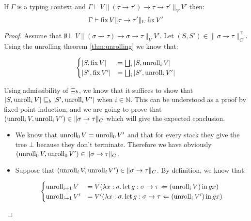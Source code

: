 \begin{alemma}
    If $\Gamma$ is a typing context and $\Gamma \vdash V \| (\tau \to \tau') \to
\tau \to \tau' \|_V V'$ then:
    \begin{equation*}
        \Gamma \vdash \Fix V \| \tau \to \tau' \|_C \Fix V'
    \end{equation*}
\end{alemma}
\begin{proof}
Assume that $\emptyset \vdash V \| (\sigma \to \tau) \to \sigma \to
\tau \|_V V'$. Let $(S,S') \in \| \sigma \to \tau\|_C^\top$.
Using the unrolling theorem \ref{thm:unrolling} we know that:

\begin{equation*}
    \begin{cases}
        |S, \Fix V| &= \bigsqcup_i | S, \Unroll_i V |     \\
        |S', \Fix V'| &= \bigsqcup_i | S', \Unroll_i V' |
    \end{cases}
\end{equation*}

Using admissibility of $\sqeq_b$, we know that it suffices 
to show that $|S, \Unroll_i V| \sqeq_b |S', \Unroll_i V'|$
when $i \in \mathbb{N}$. This can be 
understood as a proof by fixed point induction, and we are 
going to prove that $(\Unroll_i V, \Unroll_i V') \in \| \sigma \to \tau \|_C$
which will give the expected conclusion.

\begin{itemize}
    \item We know that $\Unroll_0 V = \Unroll_0 V'$ and 
        that for every stack they give the tree $\bot$ 
        because they don't terminate. Therefore 
        we have obviously $(\Unroll_0 V, \Unroll_0 V') \in \|
        \sigma \to \tau \|_C$.

    \item Suppose that $(\Unroll_i V, \Unroll_i V') \in \| \sigma
        \to \tau \|_C$. By definition, we know that:

        \begin{equation*}
            \begin{cases}
                \Unroll_{i+1} V &= V (\lambda x:\sigma.
                        \Bind{(\Unroll_i V)}{g : \sigma \to \tau}{g
                    x}) \\
                \Unroll_{i+1} V' &= V' (\lambda x:\sigma.
                        \Bind{(\Unroll_i V')}{g : \sigma \to \tau}{g
                    x}) \\
            \end{cases}
        \end{equation*}


\end{itemize}
\end{proof}
